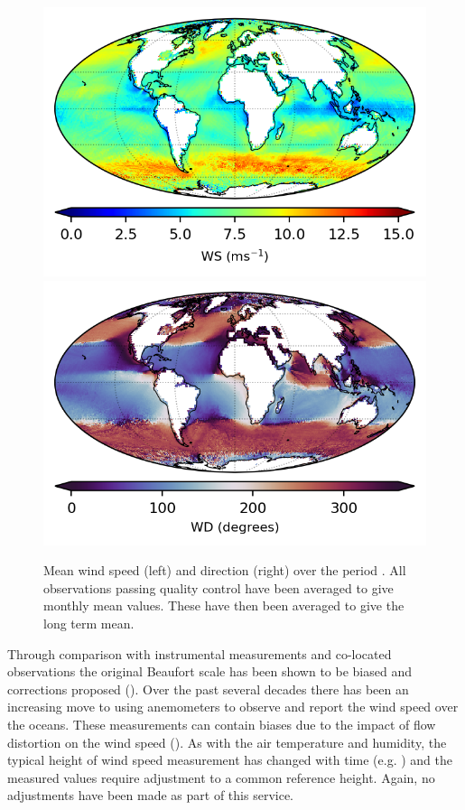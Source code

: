 \begin{figure}[h]
    \includegraphics{resources/observations-ws-mean-map-optimal.png}
    \includegraphics{resources/observations-wd-mean-map-optimal.png}
    \caption{Mean wind speed (left) and direction (right) over the period \datatimerange{}. All observations passing quality control have been averaged to give monthly mean values. These have then been averaged to give the long term mean.\\}
    \label{fig:wspd-map}
\end{figure}

Through comparison with instrumental measurements and co-located observations the original Beaufort scale has been shown to be biased and corrections proposed (\cite{Kent1997}).
Over the past several decades there has been an increasing move to using anemometers to observe and report the wind speed over the oceans. 
These measurements can contain biases due to the impact of flow distortion on the wind speed (\cite{Moat2005}).
As with the air temperature and humidity, the typical height of wind speed measurement has changed with time (e.g. \cite{Thomas2008}) and the measured values require adjustment to a common reference height.
Again, no adjustments have been made as part of this service.

